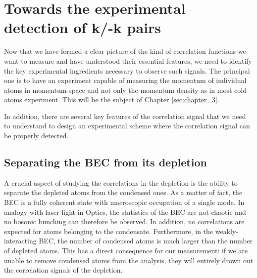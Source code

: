 \section{Towards the experimental detection of k/-k pairs}

Now that we have formed a clear picture of the kind of correlation functions we want to measure and have understood their essential features, we need to identify the key experimental ingredients necessary to observe such signals. The principal one is to have an experiment capable of measuring the momentum of individual atoms in momentum-space and not only the momentum density as in most cold atoms experiment. This will be the subject of Chapter \ref{sec:chapter_3}. 

In addition, there are several key features of the \kmk correlation signal that we need to understand to design an experimental scheme where the \kmk correlation signal can be properly detected.


\subsection{Separating the BEC from its depletion}

\label{sec:ch1_separation}

A crucial aspect of studying the correlations in the depletion is the ability to separate the depleted atoms from the condensed ones. As a matter of fact, the BEC is a fully coherent state with macroscopic occupation of a single mode. In analogy with laser light in Optics, the statistics of the BEC are not chaotic and no bosonic bunching can therefore be observed. In addition, no \kmk correlations are expected for atoms belonging to the condensate. Furthermore, in the weakly-interacting BEC, the number of condensed atoms is much larger than the number of depleted atoms. This has a direct consequence for our measurement: if we are unable to remove condensed atoms from the analysis, they will entirely drown out the correlation signals of the depletion.

